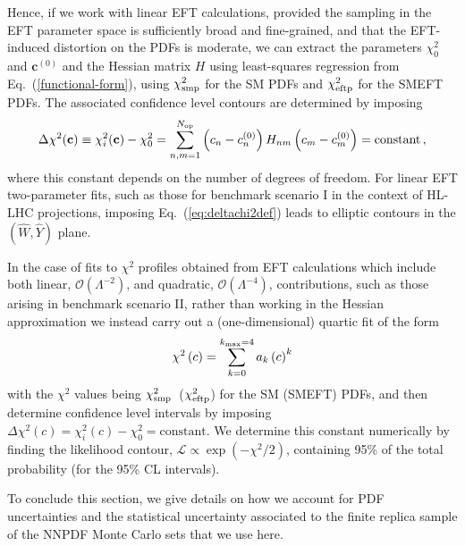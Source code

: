 \documentclass[withindex,glossary]{cam-thesis}
\begin{document}
Hence, if we work with linear EFT calculations,
provided the sampling in the EFT parameter space is sufficiently broad and fine-grained,
and that the EFT-induced distortion on the PDFs is moderate,
we can extract the parameters $\chi^2_0$ and
${\mathbf{c}}^{(0)}$ and the Hessian matrix $H$ using least-squares regression from Eq.~(\ref{functional-form}),
using $\chi^2_{\rm smp}$ for the SM PDFs and  $\chi^2_{\rm eftp}$ for the SMEFT PDFs.
% 
The associated confidence level contours are determined by imposing
\begin{align}
  \label{eq:deltachi2def}
  \Delta\chi^2({\mathbf c}) \equiv \chi_i^2({\mathbf c})
  - \chi_0^2  = \sum_{n,m=1}^{N_{\rm op}}\left( c_{n} - c^{(0)}_n\right)  H_{nm} 
    \left( c_{m} - c^{(0)}_m\right) =\text{constant}\, ,
\end{align}
where this constant depends on the number of degrees of freedom.
%
For linear EFT two-parameter fits, such as those for
benchmark scenario I in the context of HL-LHC projections, 
imposing Eq.~(\ref{eq:deltachi2def}) leads to elliptic
contours in the $( \hat{W},\hat{Y})$ plane.

In the case of fits to $\chi^2$ profiles obtained from EFT calculations which include both linear, $\mathcal{O}\left(
\Lambda^{-2}\right)$, and quadratic, $\mathcal{O}\left(\Lambda^{-4}\right)$, contributions,
such as those arising in benchmark scenario II, rather than
working in the Hessian approximation 
we instead carry out a (one-dimensional) quartic fit of the form
\begin{equation}
\label{eq:quarticfit}
 \chi^2\left( c\right) = \sum_{k=0}^{k_{\rm max}=4} a_k \left( c\right)^k
 \end{equation}
 with the $\chi^2$ values being $\chi^2_{\rm smp}$~($\chi^2_{\rm eftp}$) for the SM (SMEFT) PDFs,
 and then determine confidence level intervals by imposing $\Delta\chi^2( c) = \chi_i^2( c)- \chi_0^2
 =\text{constant}$.
 We determine this constant
numerically by finding the likelihood contour,  $\mathcal{L} \propto \exp(-\chi^{2}/2)$, containing
95\% of the total probability (for the 95\% CL intervals).

To conclude this section, we give details on how we account for PDF
uncertainties and the statistical uncertainty associated to the finite
replica sample of the NNPDF Monte Carlo sets that we use here.
\end{document}
